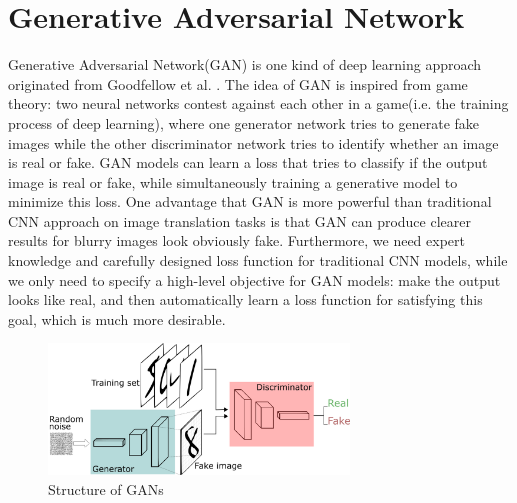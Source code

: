 \section{Generative Adversarial Network}
Generative Adversarial Network(GAN) is one kind of deep learning approach originated from 
Goodfellow et al. \cite{goodfellow2014generative}. The idea of GAN is inspired from 
game theory: two neural networks contest against each other in a game(i.e. the training
process of deep learning), where one generator network tries to generate fake images while the 
other discriminator network tries to identify whether an image is real or fake. 
GAN models can learn
a loss that tries to classify if the output image is real or fake, while simultaneously training
a generative model to minimize this loss.
One advantage 
that GAN is more powerful than traditional CNN approach on image translation tasks is that 
GAN can produce clearer results for blurry images look obviously fake. Furthermore, we need 
expert knowledge and carefully designed loss function for traditional CNN models, while we 
only need to specify a high-level objective for GAN models: make the output looks like real, and then 
automatically learn a loss function for satisfying this goal, which is much more desirable.
\begin{figure}[H]
    \begin{center}
    \includegraphics[width=8cm]{figures/GANs}
    \end{center}
    \caption{Structure of GANs}
    \label{fig:GANs-structure}
\end{figure}
